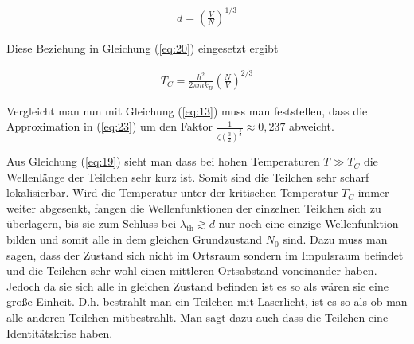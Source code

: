 \begin{align}
  \label{eq:22}
  d = \left( \frac{V}{N}\right)^{1/3}
\end{align}

Diese Beziehung in Gleichung (\ref{eq:20}) eingesetzt ergibt 

\begin{align}
  \label{eq:23}
  T_C = \frac{h^2}{2\pi mk_B} \left( \frac{N}{V}\right)^{2/3}
\end{align}

Vergleicht man nun mit Gleichung (\ref{eq:13}) muss man feststellen, dass die Approximation in (\ref{eq:23}) um den Faktor \(\frac{1}{\zeta(\frac{3}{2})^{\frac{3}{2}}}\approx 0,237 \) abweicht.

Aus Gleichung (\ref{eq:19}) sieht man dass bei hohen Temperaturen \(T\gg T_C\) die Wellenlänge der Teilchen sehr kurz ist. Somit sind die Teilchen sehr scharf lokalisierbar. Wird die Temperatur unter der kritischen Temperatur \(T_C\) immer weiter abgesenkt, fangen die Wellenfunktionen der einzelnen Teilchen sich zu überlagern, bis sie zum Schluss bei \(\lambda_{\text{th}} \gtrsim d\) nur noch eine einzige Wellenfunktion bilden und somit alle in dem gleichen Grundzustand \(N_0\) sind. Dazu muss man sagen, dass der Zustand sich nicht im Ortsraum sondern im Impulsraum befindet und die Teilchen sehr wohl einen mittleren Ortsabstand voneinander haben. Jedoch da sie sich alle in gleichen Zustand befinden ist es so als wären sie eine große Einheit. D.h. bestrahlt man ein Teilchen mit Laserlicht, ist es so als ob man alle anderen Teilchen mitbestrahlt. Man sagt dazu auch dass die Teilchen eine Identitätskrise haben.



